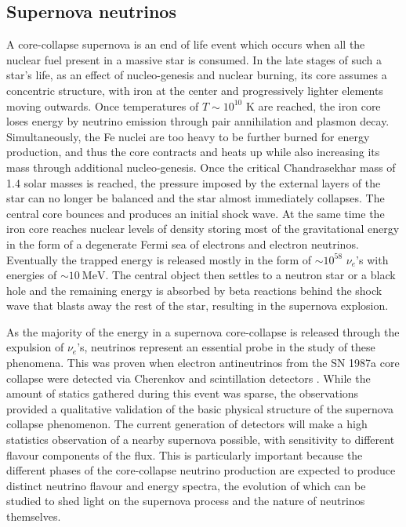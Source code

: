 \subsection{Supernova neutrinos}
\label{sec:SupernovaNeutrinos}

A core-collapse supernova is an end of life event which occurs when all the nuclear fuel present in a massive star is consumed. In the late stages of such a star's life, as an effect of nucleo-genesis and nuclear burning, its core assumes a concentric structure, with iron at the center and progressively lighter elements moving outwards. Once temperatures of $T\sim10^{10}$ K are reached, the iron core loses energy by neutrino emission through pair annihilation and plasmon decay. Simultaneously, the Fe nuclei are too heavy to be further burned for energy production, and thus the core contracts and heats up while also increasing its mass through additional nucleo-genesis. Once the critical Chandrasekhar mass of 1.4 solar masses is reached, the pressure imposed by the external layers of the star can no longer be balanced and the star almost immediately collapses. The central core bounces and produces an initial shock wave. At the same time the iron core reaches nuclear levels of density storing most of the gravitational energy in the form of a degenerate Fermi sea of electrons and electron neutrinos. Eventually the trapped energy is released mostly in the form of $\sim 10^{58}$ $\nu_e$'s with energies of $\sim10 \ \text{MeV}$. The central object then settles to a neutron star or a black hole and the remaining energy is absorbed by beta reactions behind the shock wave that blasts away the rest of the star, resulting in the supernova explosion.

As the majority of the energy in a supernova core-collapse is released through the expulsion of $\nu_e$'s, neutrinos represent an essential probe in the study of these phenomena. This was proven when electron antineutrinos from the SN 1987a core collapse were detected via Cherenkov and scintillation detectors \cite{Bionta:1987qt, Kamiokande-II:1987idp}. While the amount of statics gathered during this event was sparse, the observations provided a qualitative validation of the basic physical structure of the supernova collapse phenomenon. The current generation of detectors will make a high statistics observation of a nearby supernova possible, with sensitivity to different flavour components of the flux. This is particularly important because the different phases of the core-collapse neutrino production are expected to produce distinct neutrino flavour and energy spectra, the evolution of which can be studied to shed light on the supernova process and the nature of neutrinos themselves. 



